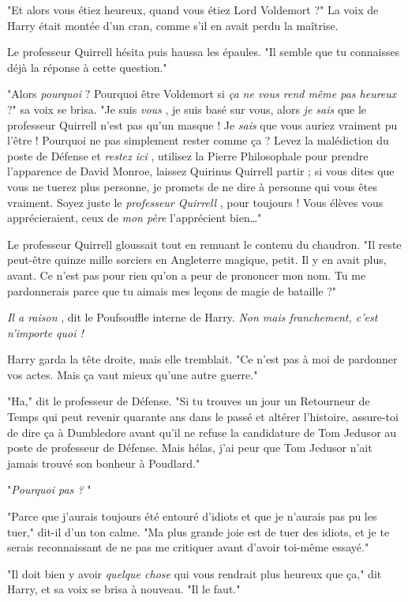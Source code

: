 "Et alors vous étiez heureux, quand vous étiez Lord Voldemort ?" La voix de Harry était montée d'un cran, comme s'il en avait perdu la maîtrise.

Le professeur Quirrell hésita puis haussa les épaules. "Il semble que tu connaisses déjà la réponse à cette question."

"Alors \emph{pourquoi}  ? Pourquoi être Voldemort si \emph{ça ne vous rend même pas heureux}  ?" sa voix se brisa. "Je suis \emph{vous} , je suis basé sur vous, alors \emph{je sais}  que le professeur Quirrell n'est pas qu'un masque ! Je \emph{sais}  que vous auriez vraiment pu l'être ! Pourquoi ne pas simplement rester comme ça ? Levez la malédiction du poste de Défense et \emph{restez ici} , utilisez la Pierre Philosophale pour prendre l'apparence de David Monroe, laissez Quirinus Quirrell partir ; si vous dites que vous ne tuerez plus personne, je promets de ne dire à personne qui vous êtes vraiment. Soyez juste le \emph{professeur Quirrell} , pour toujours ! Vous élèves vous apprécieraient, ceux de \emph{mon père}  l'apprécient bien…"

Le professeur Quirrell gloussait tout en remuant le contenu du chaudron. "Il reste peut-être quinze mille sorciers en Angleterre magique, petit. Il y en avait plus, avant. Ce n'est pas pour rien qu'on a peur de prononcer mon nom. Tu me pardonnerais parce que tu aimais mes leçons de magie de bataille ?"

\emph{Il a raison} , dit le Poufsouffle interne de Harry. \emph{Non mais franchement, c'est n'importe quoi !} 

Harry garda la tête droite, mais elle tremblait. "Ce n'est pas à moi de pardonner vos actes. Mais ça vaut mieux qu'une autre guerre."

"Ha," dit le professeur de Défense. "Si tu trouves un jour un Retourneur de Temps qui peut revenir quarante ans dans le passé et altérer l'histoire, assure-toi de dire ça à Dumbledore avant qu'il ne refuse la candidature de Tom Jedusor au poste de professeur de Défense. Mais hélas, j'ai peur que Tom Jedusor n'ait jamais trouvé son bonheur à Poudlard."

"\emph{Pourquoi pas ?} "

"Parce que j'aurais toujours été entouré d'idiots et que je n'aurais pas pu les tuer," dit-il d'un ton calme. "Ma plus grande joie est de tuer des idiots, et je te serais reconnaissant de ne pas me critiquer avant d'avoir toi-même essayé."

"Il doit bien y avoir \emph{quelque chose}  qui vous rendrait plus heureux que ça," dit Harry, et sa voix se brisa à nouveau. "Il le faut."

